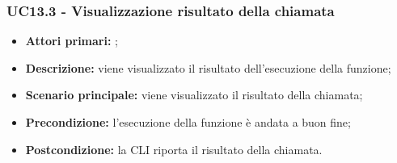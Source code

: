 \subsubsection{UC13.3 - Visualizzazione risultato della chiamata}
\begin{itemize}
	\item \textbf{Attori primari:} \ua{};
	\item \textbf{Descrizione:} viene visualizzato il risultato dell'esecuzione della funzione; 
	\item \textbf{Scenario principale:} viene visualizzato il risultato della chiamata;
	\item \textbf{Precondizione:} l’esecuzione della funzione è andata a buon fine; 
	\item \textbf{Postcondizione:} la CLI riporta il risultato della chiamata.  
\end{itemize}